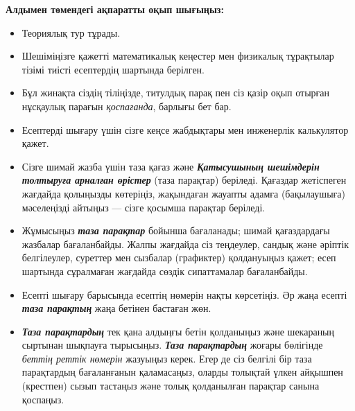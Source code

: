 \thispagestyle{empty}
\begin{center}
    \LARGE\textbf{\scshape{}}%
\end{center}
%
\vspace{2pt}%
%
\begin{center}
    \large{}
\end{center}
\vspace{2pt}
\begin{center}
    \large\textbf{Алдымен төмендегі ақпаратты оқып шығыңыз:}
\end{center}
\vspace{4pt}
\begin{itemize}[leftmargin=*]
    \item Теориялық тур  тұрады.
    \item Шешіміңізге қажетті математикалық кеңестер мен физикалық тұрақтылар тізімі тиісті есептердің шартында берілген.
    \item Бұл жинақта сіздің тіліңізде, титулдық парақ пен сіз қазір оқып отырған нұсқаулық парағын \textit{қоспағанда}, барлығы \pageref*{LastPage} бет бар.
    \item Есептерді шығару үшін сізге кеңсе жабдықтары мен инженерлік калькулятор қажет.
    \item Сізге шимай жазба үшін таза қағаз және \textbf{\textit{Қатысушының шешімдерін толтыруға арналған өрістер}} (таза парақтар) беріледі. Қағаздар жетіспеген жағдайда қолыңызды көтеріңіз, жақындаған жауапты адамға (бақылаушыға) мәселеңізді айтыңыз --- сізге қосымша парақтар беріледі.
    \item Жұмысыңыз \textbf{\textit{таза парақтар}} бойынша бағаланады; шимай қағаздардағы жазбалар бағаланбайды. Жалпы жағдайда сіз теңдеулер, сандық және әріптік белгілеулер, суреттер мен сызбалар (графиктер) қолдануыңыз қажет; есеп шартында сұралмаған жағдайда сөздік сипаттамалар бағаланбайды.
    \item Есепті шығару барысында есептің нөмерін нақты көрсетіңіз. Әр жаңа есепті \textbf{\textit{таза парақтың}} жаңа бетінен бастаған жөн.
    \item \textbf{\textit{Таза парақтардың}} тек қана алдыңғы бетін қолданыңыз және шекараның сыртынан шықпауға тырысыңыз. \textbf{\textit{Таза парақтардың}} жоғары бөлігінде \textit{беттің реттік нөмерін} жазуыңыз керек. Егер де сіз белгілі бір таза парақтардың бағаланғанын қаламасаңыз, оларды толықтай үлкен айқышпен (крестпен) сызып тастаңыз және толық қолданылған парақтар санына қоспаңыз.

\end{itemize}
